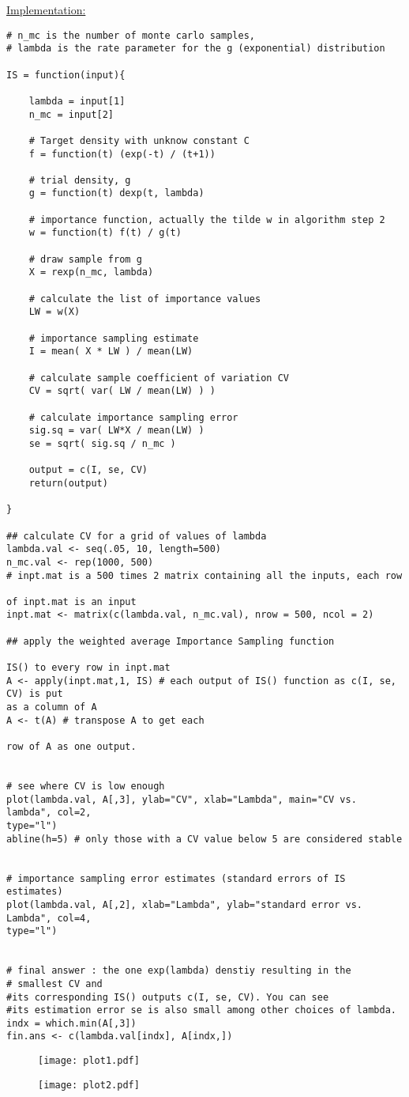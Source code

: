 \documentclass[12pt]{article}
\numberwithin{equation}{subsection}
\begin{document}
\underline{Implementation:} 

\begin{verbatim}
# n_mc is the number of monte carlo samples,
# lambda is the rate parameter for the g (exponential) distribution

IS = function(input){

	lambda = input[1]
	n_mc = input[2]
	
	# Target density with unknow constant C
	f = function(t) (exp(-t) / (t+1))
	
	# trial density, g
	g = function(t) dexp(t, lambda)
	
	# importance function, actually the tilde w in algorithm step 2
	w = function(t) f(t) / g(t)
	
	# draw sample from g
	X = rexp(n_mc, lambda)
	
	# calculate the list of importance values
	LW = w(X)
	
	# importance sampling estimate
	I = mean( X * LW ) / mean(LW)
	
	# calculate sample coefficient of variation CV
	CV = sqrt( var( LW / mean(LW) ) )
	
	# calculate importance sampling error
	sig.sq = var( LW*X / mean(LW) )
	se = sqrt( sig.sq / n_mc )
	
	output = c(I, se, CV)
	return(output)

}

## calculate CV for a grid of values of lambda
lambda.val <- seq(.05, 10, length=500)
n_mc.val <- rep(1000, 500)
# inpt.mat is a 500 times 2 matrix containing all the inputs, each row 

of inpt.mat is an input
inpt.mat <- matrix(c(lambda.val, n_mc.val), nrow = 500, ncol = 2)

## apply the weighted average Importance Sampling function 

IS() to every row in inpt.mat
A <- apply(inpt.mat,1, IS) # each output of IS() function as c(I, se, CV) is put 
as a column of A
A <- t(A) # transpose A to get each 

row of A as one output.


# see where CV is low enough
plot(lambda.val, A[,3], ylab="CV", xlab="Lambda", main="CV vs. lambda", col=2, 
type="l")
abline(h=5) # only those with a CV value below 5 are considered stable


# importance sampling error estimates (standard errors of IS estimates)
plot(lambda.val, A[,2], xlab="Lambda", ylab="standard error vs. Lambda", col=4, 
type="l")


# final answer : the one exp(lambda) denstiy resulting in the 
# smallest CV and 
#its corresponding IS() outputs c(I, se, CV). You can see 
#its estimation error se is also small among other choices of lambda.
indx = which.min(A[,3])
fin.ans <- c(lambda.val[indx], A[indx,])
\end{verbatim}

\begin{figure} 
\center
\texttt{[image: plot1.pdf]}
\end{figure}

\begin{figure} 
\center
\texttt{[image: plot2.pdf]}
\end{figure}
\end{document}
